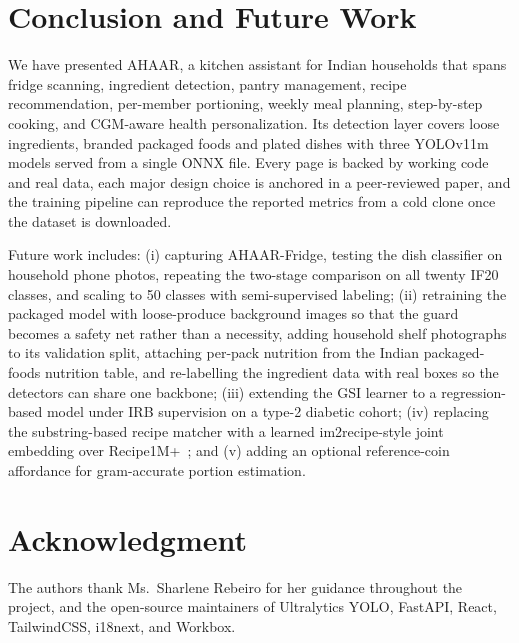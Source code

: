 \documentclass[journal]{IEEEtran}
\begin{document}
\section{Conclusion and Future Work}
\label{sec:conclusion}

We have presented AHAAR, a kitchen assistant for Indian households
that spans fridge scanning, ingredient detection, pantry management,
recipe recommendation, per-member portioning, weekly meal planning,
step-by-step cooking, and CGM-aware health personalization. Its
detection layer covers loose ingredients, branded packaged foods and
plated dishes with three YOLOv11m models served from a single ONNX
file. Every
page is backed by working code and real data, each major design choice
is anchored in a peer-reviewed paper, and the training pipeline can
reproduce the reported metrics from a cold clone once the dataset is
downloaded.

Future work includes: (i) capturing AHAAR-Fridge, testing the dish
classifier on household phone photos, repeating the two-stage
comparison on all twenty IF20 classes, and scaling to 50 classes with
semi-supervised labeling; (ii) retraining the packaged model with
loose-produce background images so that the guard becomes a safety
net rather than a necessity, adding household shelf photographs to its
validation split, attaching per-pack nutrition from the Indian
packaged-foods nutrition table, and re-labelling the ingredient data
with real boxes so the detectors can share one backbone;
(iii) extending the GSI learner to a
regression-based model under IRB supervision on a type-2 diabetic
cohort; (iv) replacing the substring-based recipe matcher with a
learned im2recipe-style joint embedding over
Recipe1M+~\cite{marin2021recipe1m}; and (v) adding an optional
reference-coin affordance for gram-accurate portion estimation.

\section*{Acknowledgment}
The authors thank Ms.\ Sharlene Rebeiro for her guidance throughout
the project, and the open-source maintainers of Ultralytics YOLO,
FastAPI, React, TailwindCSS, i18next, and Workbox.



\end{document}
